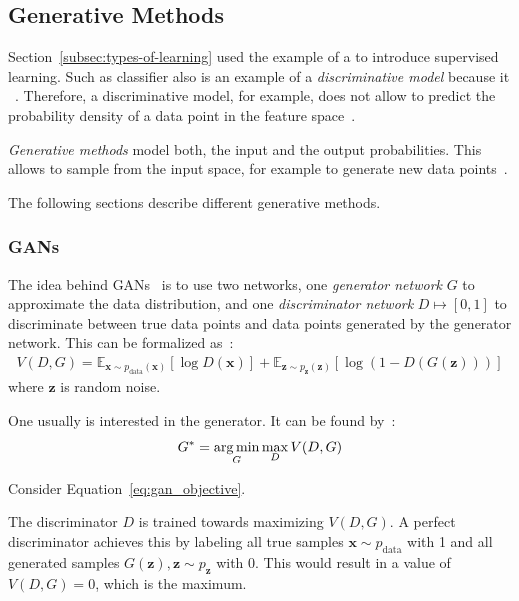 \subsection{Generative Methods}\label{subsec:generative-methods}

Section~\ref{subsec:types-of-learning} used the example of a  to introduce supervised learning.
Such as classifier also is an example of a \textit{discriminative model} because it ~\citep[p. 43]{bishop2006pattern}.
Therefore, a discriminative model, for example, does not allow to predict the probability density of a data point in the feature space~\citep[pp. 43,44]{bishop2006pattern}.

\textit{Generative methods} model both, the input and the output probabilities.
This allows to sample from the input space, for example to generate new data points~\citep[p. 43]{bishop2006pattern}.

The following sections describe different generative methods.

\subsubsection{\acfp{GAN}}\label{subsubsec:gans}

The idea behind \acp{GAN}~\citep{goodfellow2014gans} is to use two networks, one \textit{generator network} $G$ to approximate the data distribution, and one \textit{discriminator network} $D \mapsto [0, 1]$ to discriminate between true data points and data points generated by the generator network.
This can be formalized as~\citep{goodfellow2014gans}:
\begin{align}
    V(D, G)=\mathbb{E}_{\bm{x} \sim p_{\text{data}}(\bm{x})}[\log D(\bm{x})]+\mathbb{E}_{\bm{z} \sim p_{\bm{z}}(\bm{z})}[\log (1-D(G(\bm{z})))]
\end{align}
where $\bm{z}$ is random noise.

One usually is interested in the generator.
It can be found by~\citep{goodfellow2014gans}:
\begin{align}
    G^* = \operatorname*{arg\,min}_G \max_{D} V(D, G) \label{eq:gan_objective}
\end{align}

Consider Equation~\ref{eq:gan_objective}.

The discriminator $D$ is trained towards maximizing $V(D, G)$.
A perfect discriminator achieves this by labeling all true samples $\bm{x} \sim p_{\text{data}}$ with 1 and all generated samples $G(\bm{z}), \bm{z}\sim p_{\bm{z}}$ with 0.
This would result in a value of $V(D, G) = 0$, which is the maximum.

